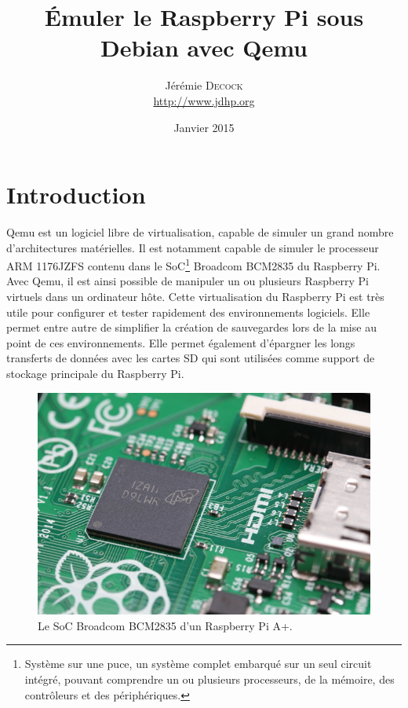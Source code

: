 \documentclass{article}
\title{Émuler le Raspberry Pi sous Debian avec Qemu}
\author{Jérémie \textsc{Decock} \\ \url{http://www.jdhp.org}}
\date{Janvier 2015}
\begin{document}
\maketitle

\tableofcontents


\section*{Introduction}\label{sec:intro}

Qemu est un logiciel libre de virtualisation, capable de simuler un grand
nombre d'architectures matérielles.
Il est notamment capable de simuler le processeur ARM 1176JZFS contenu dans
le SoC\footnote{Système sur une puce, un système complet embarqué sur un seul
circuit intégré, pouvant comprendre un ou plusieurs processeurs, de la mémoire,
des contrôleurs et des périphériques.} Broadcom BCM2835 du Raspberry Pi.
Avec Qemu, il est ainsi possible de manipuler un ou plusieurs Raspberry Pi
virtuels dans un ordinateur hôte.
Cette virtualisation du Raspberry Pi est très utile pour configurer et tester
rapidement des environnements logiciels.
Elle permet entre autre de simplifier la création de sauvegardes lors de la
mise au point de ces environnements.
Elle permet également d'épargner les longs transferts de données avec les
cartes SD qui sont utilisées comme support de stockage principale du Raspberry
Pi.

\begin{figure}
    \centering
    \ifpdf
    \includegraphics[width=.70\linewidth]{fig/bcm2835.jpeg}
    \else
    \fi
    \caption{\label{fig:bcm2835}Le SoC Broadcom BCM2835 d'un Raspberry Pi A+.}
\end{figure}
\end{document}
